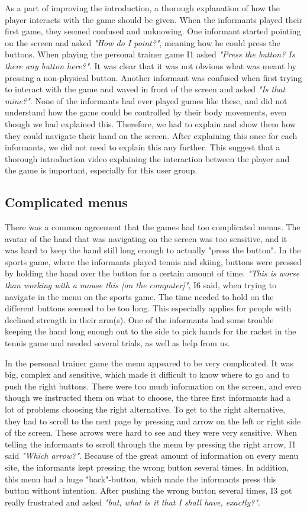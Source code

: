 As a part of improving the introduction, a thorough explanation of how the player interacts with the game should be given. When the informants played their first game, they seemed confused and unknowing. One informant started pointing on the screen and asked \emph{"How do I point?"}, meaning how he could press the buttons. When playing the personal trainer game I1 asked \emph{"Press the button? Is there any button here?"}. It was clear that it was not obvious what was meant by pressing a non-physical button. Another informant was confused when first trying to interact with the game and waved in front of the screen and asked \emph{"Is that mine?"}.  None of the informants had ever played games like these, and did not understand how the game could be controlled by their body movements, even though we had explained this. Therefore, we had to explain and show them how they could navigate their hand on the screen. After explaining this once for each informants, we did not need to explain this any further. This suggest that a thorough introduction video explaining the interaction between the player and the game is important, especially for this user group. 

\subsection{Complicated menus}
There was a common agreement that the games had too complicated menus.  The avatar of the hand that was navigating on the screen was too sensitive, and it was hard to keep the hand still long enough to actually "press the button". In the sports game, where the informants played tennis and skiing, buttons were pressed by holding the hand over the button for a certain amount of time. \emph{"This is worse than working with a mouse this [on the computer]"}, I6 said, when trying to navigate in the menu on the sports game. The time needed to hold on the different buttons seemed to be too long. This especially applies for people with declined strength in their arm(s). One of the informants had some trouble keeping the hand long enough out to the side to pick hands for the racket in the tennis game and needed several trials, as well as help from us.

In the personal trainer game the menu appeared to be very complicated. It was big, complex and sensitive, which made it difficult to know where to go and to push the right buttons. There were too much information on the screen, and even though we instructed them on what to choose, the three first informants had a lot of problems choosing the right alternative. To get to the right alternative, they had to scroll to the next page by pressing and arrow on the left or right side of the screen. These arrows were hard to see and they were very sensitive. When telling the informants to scroll through the menu by pressing the right arrow, I1 said \emph{"Which arrow?"}. Because of the great amount of information on every menu site, the informants kept pressing the wrong button several times. In addition, this menu had a huge "back"-button, which made the informants press this button without intention. After pushing the wrong button several times, I3 got really frustrated and asked \emph{"but, what is it that I shall have, exactly?"}. 

